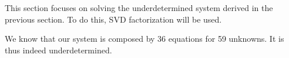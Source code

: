 This section focuses on solving the underdetermined system derived in the previous section. To do this, SVD factorization will be used. 

We know that our system is composed by 36 equations for 59 unknowns. It is thus indeed underdetermined.